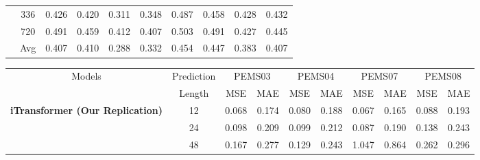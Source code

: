 \documentclass[twoside,12pt]{article}
\begin{document}
\begin{table}[htbp]
{\begin{small}
\begin{tabular}{c|c|cc|cc|cc|cc}
                                                                 & 336        & 0.426                      & 0.420                      & 0.311                      & 0.348                     & 0.487 & 0.458 & 0.428 & 0.432 \\
                                                                 & 720        & 0.491                      & 0.459                      & 0.412                      & 0.407                     & 0.503 & 0.491 & 0.427 & 0.445 \\
        \cmidrule(lr){2-10}
                                                                 & Avg        & 0.407                      & 0.410                      & 0.288                      & 0.332                     & 0.454 & 0.447 & 0.383 & 0.407 \\
        \bottomrule
      \end{tabular}
    \end{small}
  }
  \resizebox{0.9\textwidth}{!}
  {
    \begin{small}
      \renewcommand{\multirowsetup}{\centering}
      \setlength{\tabcolsep}{5.3pt}
      \begin{tabular}{c|c|cc|cc|cc|cc}
        \toprule
        \multirow{2}{*}{Models}                                  & Prediction & \multicolumn{2}{c|}{PEMS03} & \multicolumn{2}{c|}{PEMS04} & \multicolumn{2}{c|}{PEMS07} & \multicolumn{2}{c}{PEMS08}                                 \\
        \cmidrule(lr){3-4} \cmidrule(lr){5-6} \cmidrule(lr){7-8} \cmidrule(lr){9-10}
                                                                 & Length     & MSE                         & MAE                         & MSE                         & MAE                        & MSE   & MAE   & MSE   & MAE   \\
        \midrule
        \multirow{5}{*}{\textbf{iTransformer (Our Replication)}} & 12         & 0.068                       & 0.174                       & 0.080                       & 0.188                      & 0.067 & 0.165 & 0.088 & 0.193 \\
                                                                 & 24         & 0.098                       & 0.209                       & 0.099                       & 0.212                      & 0.087 & 0.190 & 0.138 & 0.243 \\
                                                                 & 48         & 0.167                       & 0.277                       & 0.129                       & 0.243                      & 1.047 & 0.864 & 0.262 & 0.296 \\

\end{tabular}
\end{small}}
\end{table}
\end{document}
